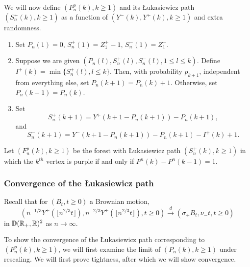We will now define $(F_n^p(k),k\geq 1)$ and its \L ukasiewicz path $(S_n^{+}(k), k\geq 1)$ as a function of $(Y^-(k), Y^+(k) ,k\geq 1)$ and extra randomness.
\begin{enumerate} 
    \item Set $P_n(1)=0$, $S_n^{+}(1)=Z_1^+-1$, $S_n^{-}(1)=Z_1^-$. 
    \item Suppose we are given $(P_n(l),S_n^{+}(l),S_n^{-}(l), 1\leq l \leq k)$. Define 
    $I^{+}(k)=\min\{S_n^{+}(l), l\leq k\}$. Then, with probability $p_{k+1}$, independent from everything else, set $P_n(k+1)=P_n(k)+1$. Otherwise, set $P_n(k+1)=P_n(k)$. 
    \item Set $$S_n^{+}(k+1)=Y^+(k+1-P_n(k+1))-P_n(k+1),$$ and $$S_n^{-}(k+1)=Y^-(k+1-P_n(k+1))-P_n(k+1)-I^{+}(k)+1.$$
\end{enumerate}
Let $(F^p_n(k),k\geq 1)$ be the forest with \L ukasiewicz path $(S_n^{+}(k), k\geq 1)$ in which the $k^{th}$ vertex is purple if and only if $P^n(k)-P^n(k-1)=1$. 
\subsubsection{Convergence of the \L ukasiewicz path}
Recall that for $(B_t,t\geq 0)$ a Brownian motion,
\begin{equation}\label{eq.jointconvergenceinout}
    \left(n^{-1/3}Y^+\left(\lfloor n^{2/3}t\rfloor \right), n^{-2/3}Y^+\left(\lfloor n^{2/3}t\rfloor \right),t\geq 0\right)\overset{d}{\to}\left(\sigma_+B_t,\nu_-t,t\geq 0\right)
\end{equation}
in ${\mathbb D}({\mathbb R}_+,{\mathbb R})^2$ as $n\to \infty$. 

To show the convergence of the \L ukasiewicz path corresponding to $(F^p_n(k),k\geq 1)$, we will first examine the limit of $(P_n(k), k\geq 1)$ under rescaling. We will first prove tightness, after which we will show convergence.


